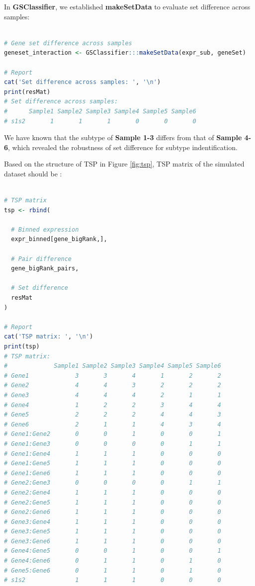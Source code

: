 \documentclass[
  12pt,
]{book}
\begin{document}
In \textbf{GSClassifier}, we established \textbf{makeSetData} to evaluate set difference across samples:

\begin{lstlisting}[language=R]

# Gene set difference across samples
geneset_interaction <- GSClassifier:::makeSetData(expr_sub, geneSet)

# Report 
cat('Set difference across samples: ', '\n')
print(resMat)
# Set difference across samples:  
#      Sample1 Sample2 Sample3 Sample4 Sample5 Sample6
# s1s2       1       1       1       0       0       0
\end{lstlisting}

We have known that the subtype of \textbf{Sample 1-3} differs from that of \textbf{Sample 4-6}, which revealed the robustness of set difference for subtype indentification.

Based on the structure of TSP in Figure \ref{fig:tsp}, TSP matrix of the simulated dataset should be :

\begin{lstlisting}[language=R]

# TSP matrix
tsp <- rbind(
  
  # Binned expression
  expr_binned[gene_bigRank,],
  
  # Pair difference
  gene_bigRank_pairs,
  
  # Set difference
  resMat
)

# Report 
cat('TSP matrix: ', '\n')
print(tsp)
# TSP matrix:  
#             Sample1 Sample2 Sample3 Sample4 Sample5 Sample6
# Gene1             3       3       4       1       2       2
# Gene2             4       4       3       2       2       2
# Gene3             4       4       4       2       1       1
# Gene4             1       2       2       3       4       4
# Gene5             2       2       2       4       4       3
# Gene6             2       1       1       4       3       4
# Gene1:Gene2       0       0       1       0       0       1
# Gene1:Gene3       0       0       0       0       1       1
# Gene1:Gene4       1       1       1       0       0       0
# Gene1:Gene5       1       1       1       0       0       0
# Gene1:Gene6       1       1       1       0       0       0
# Gene2:Gene3       0       0       0       0       1       1
# Gene2:Gene4       1       1       1       0       0       0
# Gene2:Gene5       1       1       1       0       0       0
# Gene2:Gene6       1       1       1       0       0       0
# Gene3:Gene4       1       1       1       0       0       0
# Gene3:Gene5       1       1       1       0       0       0
# Gene3:Gene6       1       1       1       0       0       0
# Gene4:Gene5       0       0       1       0       0       1
# Gene4:Gene6       0       1       1       0       1       0
# Gene5:Gene6       0       1       1       0       1       0
# s1s2              1       1       1       0       0       0
\end{lstlisting}
\end{document}
